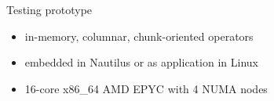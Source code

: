 \begin{block}{Testing prototype}
  \begin{itemize}
  \item in-memory, columnar, chunk-oriented operators
  \item embedded in Nautilus or as application in Linux
  \item 16-core x86\_64 AMD EPYC with 4 NUMA nodes
  \end{itemize}
\end{block}
